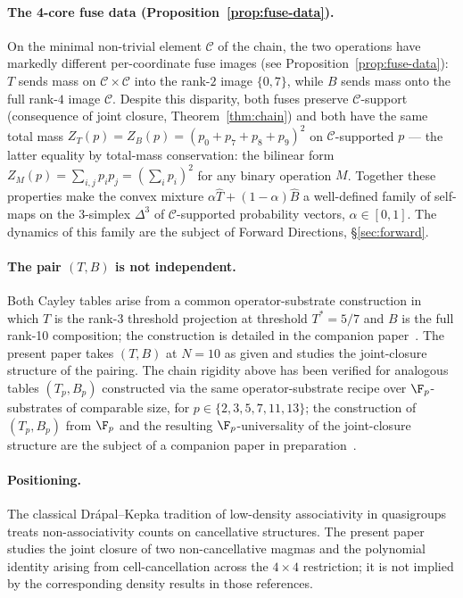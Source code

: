 \documentclass[11pt,reqno]{amsart}
\theoremstyle{plain}
\theoremstyle{definition}
\theoremstyle{remark}
\newcommand{\Cfour}{\mathcal{C}}
\begin{document}
\paragraph{The 4-core fuse data (Proposition~\ref{prop:fuse-data}).}
On the minimal non-trivial element $\Cfour$ of the chain, the two
operations have markedly different per-coordinate fuse images
(see Proposition~\ref{prop:fuse-data}): $T$ sends mass on
$\Cfour\times\Cfour$ into the rank-$2$ image $\{0, 7\}$, while $B$
sends mass onto the full rank-$4$ image $\Cfour$. Despite this
disparity, both fuses preserve $\Cfour$-support (consequence of
joint closure, Theorem~\ref{thm:chain}) and both have the same
total mass $Z_{T}(p) = Z_{B}(p) = (p_{0}+p_{7}+p_{8}+p_{9})^{2}$
on $\Cfour$-supported $p$ --- the latter equality by total-mass
conservation: the bilinear form $Z_{M}(p) = \sum_{i,j}p_{i}p_{j}
= (\sum_{i}p_{i})^{2}$ for any binary operation $M$. Together
these properties make the convex mixture $\alpha\widehat{T} +
(1-\alpha)\widehat{B}$ a well-defined family of self-maps on the
$3$-simplex $\Delta^{3}$ of $\Cfour$-supported probability
vectors, $\alpha\in[0,1]$. The dynamics of this family are
the subject of Forward Directions, \S\ref{sec:forward}.

\paragraph{The pair $(T,B)$ is not independent.} Both Cayley
tables arise from a common operator-substrate construction in
which $T$ is the rank-3 threshold projection at threshold
$T^{*} = 5/7$ and $B$ is the full rank-10 composition; the
construction is detailed in the companion
paper~\cite{SandersGish2026Sigma}. The present paper takes
$(T, B)$ at $N = 10$ as given and studies the joint-closure
structure of the pairing. The chain rigidity above has been
verified for analogous tables $(T_{p}, B_{p})$ constructed via
the same operator-substrate recipe over $\F_{p}$-substrates of
comparable size, for $p \in \{2, 3, 5, 7, 11, 13\}$; the
construction of $(T_{p}, B_{p})$ from $\F_{p}$ and the resulting
$\F_{p}$-universality of the joint-closure structure are the
subject of a companion paper in
preparation~\cite{SandersClaudeChat2026BridgeSprint}.

\paragraph{Positioning.} The classical Drápal--Kepka tradition
of low-density associativity in
quasigroups~\cite{Kepka1980, DrapalKepka1985} treats
non-associativity counts on cancellative structures. The present
paper studies the joint closure of two non-cancellative magmas
and the polynomial identity arising from cell-cancellation
across the $4\times 4$ restriction; it is not implied by the
corresponding density results in those references.
\end{document}
